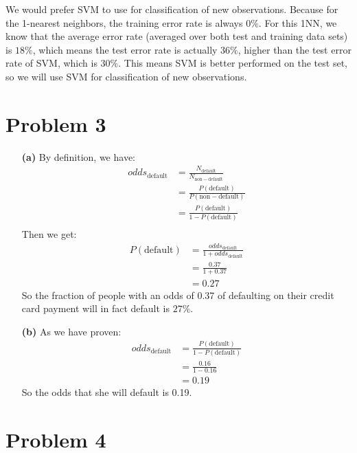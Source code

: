 \documentclass[twoside,11pt]{homework}
\begin{document}
We would prefer SVM to use for classification of new observations. Because for the 1-nearest neighbors, the training error rate is always $0\%$. For this 1NN, we know that the average error rate
(averaged over both test and training data sets) is $18\%$, which means the test error rate is actually $36\%$, higher than the test error rate of SVM, which is $30\%$. This means SVM is better performed on the test set, so we will use SVM for classification of new observations.


\section*{Problem 3}

\begin{enumerate}
\item[\textbf{(a)}] By definition, we have:
\begin{align*}
odds_{\mathrm{default}} 
&= \frac{N_\mathrm{default}}{N_\mathrm{non-default}}\\
&= \frac{P(\mathrm{default})}{P(\mathrm{non-default})}\\
&=  \frac{P(\mathrm{default})}{1-P(\mathrm{default})}\\
\end{align*}
Then we get:
\begin{align*}
P(\mathrm{default}) &= \frac{odds_{\mathrm{default}} }{1+ odds_{\mathrm{default}} }\\
&= \frac{0.37}{1+0.37}\\
&= 0.27
\end{align*}
So the fraction of people with an odds of 0.37 of defaulting on their credit card payment will in fact default is $27\%$.

\item[\textbf{(b)}] As we have proven:
\begin{align*}
odds_{\mathrm{default}} 
&=  \frac{P(\mathrm{default})}{1-P(\mathrm{default})}\\
&= \frac{0.16}{1-0.16}\\
&= 0.19
\end{align*}
So the odds that she will default is 0.19.
\end{enumerate}


\section*{Problem 4}
\end{document}

